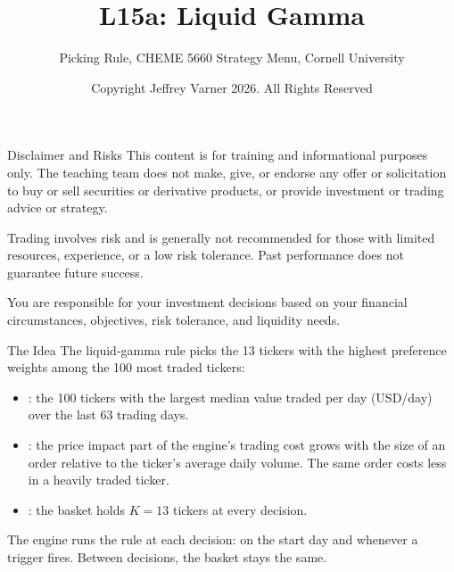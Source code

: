 \documentclass[aspectratio=169,11pt]{beamer}
\title{\texorpdfstring{{\vnheavy L15a}}{L15a}: Liquid Gamma}
\subtitle{Picking Rule, CHEME 5660 Strategy Menu, Cornell University}
\author{Copyright Jeffrey Varner 2026. All Rights Reserved}
\begin{document}
\vntitlepage

\begin{frame}{Disclaimer and Risks}
  \vspace{0.6em}
  \textbf{} This content is for training and informational
  purposes only. The teaching team does not make, give, or endorse any offer or
  solicitation to buy or sell securities or derivative products, or provide
  investment or trading advice or strategy.

  \vspace{1.1em}
  \textbf{} Trading involves risk and is generally not recommended for
  those with limited resources, experience, or a low risk tolerance. Past
  performance does not guarantee future success.

  \vspace{1.1em}
  \textbf{} You are responsible for your investment decisions
  based on your financial circumstances, objectives, risk tolerance, and
  liquidity needs.
\end{frame}

\begin{frame}{The Idea}
  \vspace{0.3em}
  The liquid-gamma rule picks the 13 tickers with the highest preference weights among the 100 most traded
  tickers:
  \begin{itemize}\setlength{\itemsep}{0.5em}
    \item {}: the 100 tickers with the largest median value traded per day (USD/day) over the last 63 trading days.
    \item {}: the price impact part of the engine's trading cost grows with the size of an order relative to the ticker's average daily volume. The same order costs less in a heavily traded ticker.
    \item {}: the basket holds $K=13$ tickers at every decision.
  \end{itemize}

  \vspace{0.5em}
  The engine runs the rule at each decision: on the start day and whenever a trigger fires. Between decisions, the basket stays the same.
\end{frame}
\end{document}

